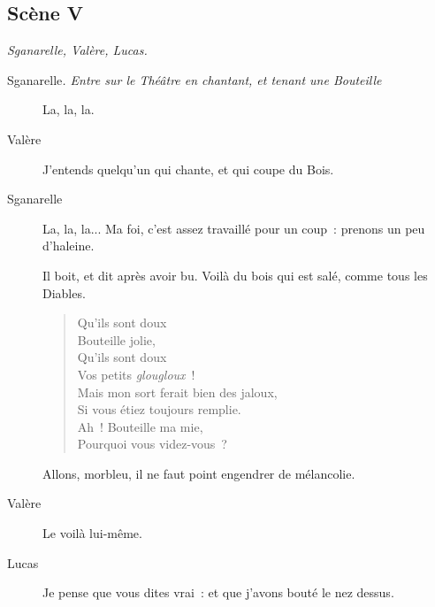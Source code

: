 \documentclass[french,twoside]{book} %
\begin{document}
\subsection[{Scène V}]{Scène V}
\label{I05}
\textit{Sganarelle, Valère, Lucas.}\par
\noindent \par
 \begin{description} \item[Sganarelle\textit{. Entre sur le Théâtre en chantant, et tenant une Bouteille}\par
] 

La, la, la.\end{description}
 \begin{description} \item[Valère] 

J’entends quelqu’un qui chante, et qui coupe du Bois.\end{description}
 \begin{description} \item[Sganarelle] 

La, la, la... Ma foi, c’est assez travaillé pour un coup : prenons un peu d’haleine.

Il boit, et dit après avoir bu. Voilà du bois qui est salé, comme tous les Diables.
\begin{verse}
Qu’ils sont doux\\
Bouteille jolie,\\
Qu’ils sont doux\\
Vos petits {\itshape glougloux} !\\
Mais mon sort ferait bien des jaloux,\\
Si vous étiez toujours remplie.\\
Ah ! Bouteille ma mie,\\
Pourquoi vous videz-vous ?\\
\end{verse}


Allons, morbleu, il ne faut point engendrer de mélancolie.\end{description}
 \begin{description} \item[Valère] 

Le voilà lui-même.\end{description}
 \begin{description} \item[Lucas] 

Je pense que vous dites vrai : et que j’avons bouté le nez dessus.\end{description}
\end{document}
